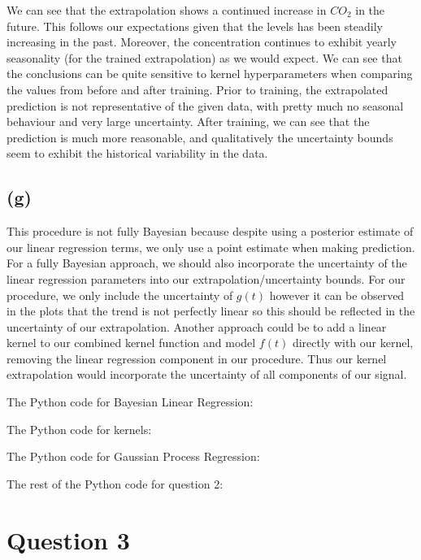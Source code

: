 \documentclass[12pt]{article}
\begin{document}
We can see that the extrapolation shows a continued increase in $CO_2$ in the future.
This follows our expectations given that the levels has been steadily increasing in the past.
Moreover, the concentration continues to exhibit yearly seasonality (for the trained extrapolation) as we would expect.
We can see that the conclusions can be quite sensitive to kernel hyperparameters when comparing the values from before and after training.
Prior to training, the extrapolated prediction is not representative of the given data, with pretty much no seasonal behaviour and very large uncertainty.
After training, we can see that the prediction is much more reasonable, and qualitatively the uncertainty bounds seem to exhibit the historical variability in the data.


\subsection*{(g)}

This procedure is not fully Bayesian because despite using a posterior estimate of our linear regression terms, we only use a point estimate when making prediction.
For a fully Bayesian approach, we should also incorporate the uncertainty of the linear regression parameters into our extrapolation/uncertainty bounds.
For our procedure, we only include the uncertainty of $g(t)$ however it can be observed in the plots that the trend is not perfectly linear so this should be reflected in the uncertainty of our extrapolation.
Another approach could be to add a linear kernel to our combined kernel function and model $f(t)$ directly with our kernel, removing the linear regression component in our procedure.
Thus our kernel extrapolation would incorporate the uncertainty of all components of our signal.

\newpage
The Python code for Bayesian Linear Regression:


\newpage
The Python code for kernels:


\newpage
The Python code for Gaussian Process Regression:


\newpage
The rest of the Python code for question 2:


\newpage
\section*{Question 3}
\end{document}
